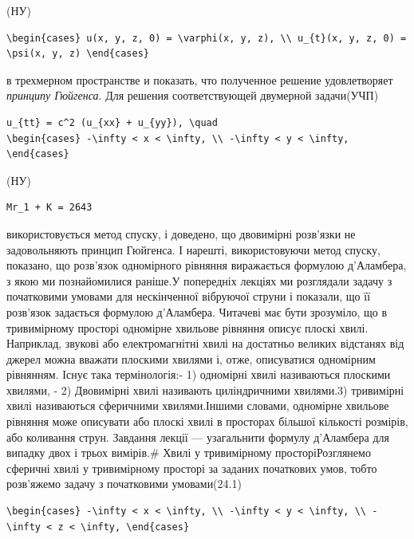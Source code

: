 \documentclass[
  ukrainian,
]{article}
\begin{document}
(НУ)

\begin{verbatim}
\begin{cases} u(x, y, z, 0) = \varphi(x, y, z), \\ u_{t}(x, y, z, 0) = \psi(x, y, z) \end{cases}
\end{verbatim}

в трехмерном пространстве и показать, что полученное решение
удовлетворяет \emph{принципу Гюйгенса}. Для решения соответствующей
двумерной задачи(УЧП)

\begin{verbatim}
u_{tt} = c^2 (u_{xx} + u_{yy}), \quad
\begin{cases} -\infty < x < \infty, \\ -\infty < y < \infty, \end{cases}
\end{verbatim}

(НУ)

\begin{verbatim}
Mr_1 + K = 2643
\end{verbatim}

використовується метод спуску, і доведено, що двовимірні розв'язки не
задовольняють принцип Гюйгенса. І нарешті, використовуючи метод спуску,
показано, що розв'язок одномірного рівняння виражається формулою
д'Аламбера, з якою ми познайомилися раніше.У попередніх лекціях ми
розглядали задачу з початковими умовами для нескінченної вібруючої
струни і показали, що її розв'язок задається формулою д'Аламбера.
Читачеві має бути зрозуміло, що в тривимірному просторі одномірне
хвильове рівняння описує плоскі хвилі. Наприклад, звукові або
електромагнітні хвилі на достатньо великих відстанях від джерел можна
вважати плоскими хвилями і, отже, описуватися одномірним рівнянням.
Існує така термінологія:- 1) одномірні хвилі називаються плоскими
хвилями, - 2) Двовимірні хвилі називають циліндричними хвилями.3)
тривимірні хвилі називаються сферичними хвилями.Іншими словами,
одномірне хвильове рівняння може описувати або плоскі хвилі в просторах
більшої кількості розмірів, або коливання струн. Завдання лекції ---
узагальнити формулу д'Аламбера для випадку двох і трьох вимірів.\# Хвилі
у тривимірному просторіРозглянемо сферичні хвилі у тривимірному просторі
за заданих початкових умов, тобто розв'яжемо задачу з початковими
умовами(24.1)

\begin{verbatim}
\begin{cases} -\infty < x < \infty, \\ -\infty < y < \infty, \\ -\infty < z < \infty, \end{cases}
\end{verbatim}
\end{document}
